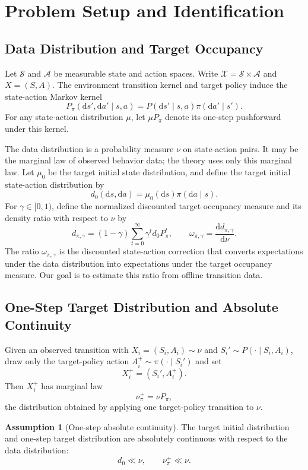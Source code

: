 \documentclass{article}
\newcommand{\sS}{\mathcal{S}}
\newcommand{\sA}{\mathcal{A}}
\newcommand{\sX}{\mathcal{X}}
\newcommand{\1}{\mathbf{1}}
\newcommand{\dd}{\mathrm{d}}
\newcommand{\nup}{\nu_\pi^+}
\newcommand{\omegastar}{\omega_{\pi,\gamma}}
\newcommand{\Ppi}{P_\pi}
\newcommand{\dinit}{d_0}
\theoremstyle{plain}
\theoremstyle{definition}
\newtheorem{assumption}[theorem]{Assumption}
\theoremstyle{remark}
\begin{document}
\section{Problem Setup and Identification}

\subsection{Data Distribution and Target Occupancy}

Let $\sS$ and $\sA$ be measurable state and action spaces. Write
$\sX=\sS\times\sA$ and $X=(S,A)$. The environment transition kernel and target
policy induce the state-action Markov kernel
\[
    \Ppi(\dd s',\dd a'\mid s,a)
    =
    P(\dd s'\mid s,a)\pi(\dd a'\mid s').
\]
For any state-action distribution $\mu$, let $\mu\Ppi$ denote its one-step
pushforward under this kernel.

The data distribution is a probability measure $\nu$ on state-action pairs. It
may be the marginal law of observed behavior data; the theory uses only this
marginal law. Let $\mu_0$ be the target initial state distribution, and define
the target initial state-action distribution by
\[
    \dinit(\dd s,\dd a)=\mu_0(\dd s)\pi(\dd a\mid s).
\]
For $\gamma\in[0,1)$, define the normalized discounted target occupancy measure
and its density ratio with respect to $\nu$ by
\[
    d_{\pi,\gamma}
    =
    (1-\gamma)\sum_{t=0}^{\infty}\gamma^t \dinit \Ppi^t,
    \qquad
    \omegastar=\frac{\dd d_{\pi,\gamma}}{\dd \nu}.
\]
The ratio $\omegastar$ is the discounted state-action correction that converts
expectations under the data distribution into expectations under the target
occupancy measure. Our goal is to estimate this ratio from offline transition
data.
\subsection{One-Step Target Distribution and Absolute Continuity}

Given an observed transition with $X_i=(S_i,A_i)\sim\nu$ and
$S_i'\sim P(\cdot\mid S_i,A_i)$, draw only the target-policy action
$A_i^+\sim\pi(\cdot\mid S_i')$ and set
\[
    X_i^+=(S_i',A_i^+).
\]
Then $X_i^+$ has marginal law
\[
    \nup=\nu\Ppi,
\]
the distribution obtained by applying one target-policy transition to $\nu$.

\begin{assumption}[One-step absolute continuity]
\label{ass:overlap}
The target initial distribution and one-step target distribution are absolutely
continuous with respect to the data distribution:
\[
    \dinit\ll\nu,
    \qquad
    \nup\ll\nu.
\]
\end{assumption}
\end{document}
